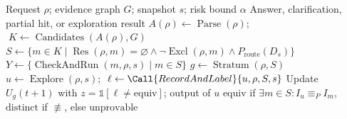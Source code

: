 \begin{algorithm}[t]
\caption{}
\label{alg:lookup}
\small
\begin{algorithmic}[1]
\Require Request $\rho$; evidence graph $G$; snapshot $s$; risk bound $\alpha$
\Ensure Answer, clarification, partial hit, or exploration result
  \State $A(\rho) \gets \operatorname{Parse}(\rho)$; $\; K \gets \operatorname{Candidates}(A(\rho), G)$
  \State $S \gets \{m \in K \mid \operatorname{Res}(\rho,m)=\varnothing \wedge \neg\operatorname{Excl}(\rho,m) \wedge P_{\mathrm{route}}(D_s)\}$
  \State $Y \gets \{\operatorname{CheckAndRun}(m,\rho,s) \mid m \in S\}$ 
   
  \State $g \gets \operatorname{Stratum}(\rho, S)$ 
  \State $u \gets \operatorname{Explore}(\rho, s)$; $\; \ell \gets \Call{RecordAndLabel}{u, \rho, S, s}$
  \State Update $U_g(t+1)$ with $z = \mathbb{1}[\ell \neq \text{equiv}]$; \Return output of $u$
\EndFunction
{}
  \EndFor
  \State \Return $\text{equiv}$ if $\exists m\in S: I_u \equiv_P I_m$, $\text{distinct}$ if $\not\equiv$, else $\text{unprovable}$
\EndFunction
\end{algorithmic}
\end{algorithm}
